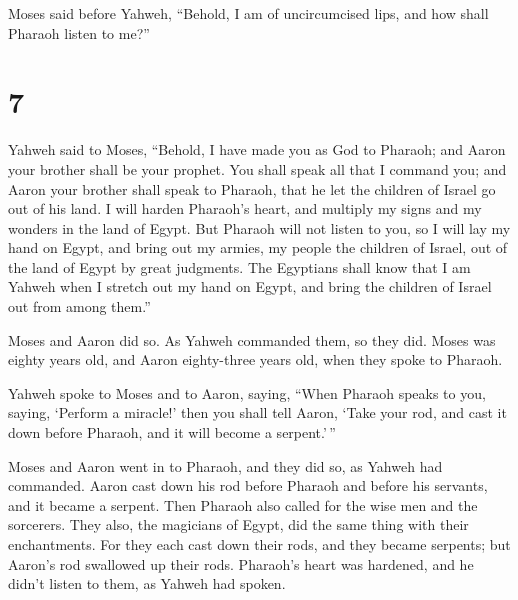  Moses said before Yahweh, ``Behold, I am of uncircumcised
lips, and how shall Pharaoh listen to me?''

\hypertarget{section-6}{%
\section{7}\label{section-6}}

 Yahweh said to Moses, ``Behold, I have made you as God to
Pharaoh; and Aaron your brother shall be your prophet.  You
shall speak all that I command you; and Aaron your brother shall speak
to Pharaoh, that he let the children of Israel go out of his land.
 I will harden Pharaoh's heart, and multiply my signs and my
wonders in the land of Egypt.  But Pharaoh will not listen
to you, so I will lay my hand on Egypt, and bring out my armies, my
people the children of Israel, out of the land of Egypt by great
judgments.  The Egyptians shall know that I am Yahweh when I
stretch out my hand on Egypt, and bring the children of Israel out from
among them.''

 Moses and Aaron did so. As Yahweh commanded them, so they
did.  Moses was eighty years old, and Aaron eighty-three
years old, when they spoke to Pharaoh.

 Yahweh spoke to Moses and to Aaron, saying, 
``When Pharaoh speaks to you, saying, `Perform a miracle!' then you
shall tell Aaron, `Take your rod, and cast it down before Pharaoh, and
it will become a serpent.'\,''

 Moses and Aaron went in to Pharaoh, and they did so, as
Yahweh had commanded. Aaron cast down his rod before Pharaoh and before
his servants, and it became a serpent.  Then Pharaoh also
called for the wise men and the sorcerers. They also, the magicians of
Egypt, did the same thing with their enchantments.  For
they each cast down their rods, and they became serpents; but Aaron's
rod swallowed up their rods.  Pharaoh's heart was hardened,
and he didn't listen to them, as Yahweh had spoken.

